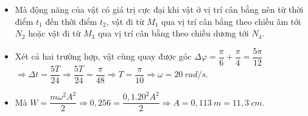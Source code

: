 \begin{ex}
{{}
\begin{itemize}
\item Mà động năng của vật có giá trị cực đại khi vật ở vị trí cân bằng nên từ thời điểm $t_1$ đến thời điểm $t_2$, vật đi từ $ M_1$ qua vị trí cân bằng theo chiều âm tới $N_2$ hoặc vật đi từ $ M_3$ qua vị trí cân bằng theo chiều dương tới $N_4$.
\item Xét cả hai trường hợp, vật cùng quay được góc $\Delta \varphi = \dfrac{\pi}{6} + \dfrac{\pi}{4} = \dfrac{5\pi}{12}$\\
$\Rightarrow \Delta t = \dfrac{5T}{24} \Rightarrow \dfrac{5T}{24} = \dfrac{\pi}{48} \Rightarrow T = \dfrac{\pi}{10} \Rightarrow \omega = 20\ rad/s$.
\item Mà $W = \dfrac{m\omega^2A^2}{2} \Rightarrow 0,256 = \dfrac{0,1.20^2A^2}{2} \Rightarrow A = 0,113\ m=11,3\ cm$.
\end{itemize}
}
\end{ex} 
